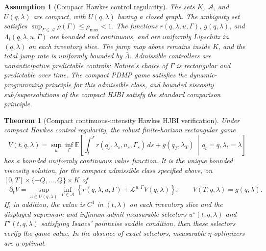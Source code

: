 \documentclass[11pt]{article}
\newtheorem{assumption}{Assumption}
\newtheorem{theorem}{Theorem}
\newcommand{\E}{\mathbb{E}}
\begin{document}
\begin{assumption}[Compact Hawkes control regularity]
The sets $K$, $\mathcal A$, and $U(q,\lambda)$ are compact, with
$U(q,\lambda)$ having a closed graph. The ambiguity set satisfies
$\sup_{\Gamma\in\mathcal A}\rho(\Gamma)\le\rho_{\max}<1$. The functions
$r(q,\lambda,u,\Gamma)$, $g(q,\lambda)$, and
$\Lambda_i(q,\lambda,u,\Gamma)$ are bounded and continuous, and are uniformly
Lipschitz in $(q,\lambda)$ on each inventory slice. The jump map above remains
inside $K$, and the total jump rate is uniformly bounded by $\bar\Lambda$.
Admissible controllers are nonanticipative predictable controls; Nature's
choice of $\Gamma$ is rectangular and predictable over time. The compact PDMP
game satisfies the dynamic-programming principle for this admissible class, and
bounded viscosity sub/supersolutions of the compact HJBI satisfy the standard
comparison principle.
\end{assumption}

\begin{theorem}[Compact continuous-intensity Hawkes HJBI verification]
Under compact Hawkes control regularity, the robust finite-horizon rectangular
game
\[
V(t,q,\lambda)=
\sup_u\inf_\Gamma
\E\left[
\int_t^T r(q_s,\lambda_s,u_s,\Gamma_s)\,ds+
g(q_T,\lambda_T)
\,\middle|\,q_t=q,\lambda_t=\lambda
\right]
\]
has a bounded uniformly continuous value function. It is the unique bounded
viscosity solution, for the compact admissible class specified above, on
$[0,T]\times\{-Q,\ldots,Q\}\times K$ of
\[
-\partial_t V=
\sup_{u\in U(q,\lambda)}\inf_{\Gamma\in\mathcal A}
\left\{
r(q,\lambda,u,\Gamma)+
\mathcal L^{u,\Gamma}V(q,\lambda)
\right\},
\qquad
V(T,q,\lambda)=g(q,\lambda).
\]
If, in addition, the value is $C^1$ in $(t,\lambda)$ on each inventory slice
and the displayed supremum and infimum admit measurable selectors
$u^\star(t,q,\lambda)$ and $\Gamma^\star(t,q,\lambda)$ satisfying Isaacs'
pointwise saddle condition, then these selectors verify the game value. In the
absence of exact selectors, measurable $\eta$-optimizers are $\eta$-optimal.
\end{theorem}
\end{document}
